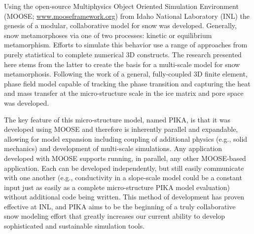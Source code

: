 Using the open-source Multiphysics Object Oriented Simulation Environment (MOOSE; \url{www.mooseframework.org}) from Idaho National Laboratory (INL) the genesis of a modular, collaborative model for snow was developed. Generally, snow metamorphoses via one of two processes: kinetic or equilibrium metamorphism. Efforts to simulate this behavior use a range of approaches from purely statistical to complete numerical 3D constructs. The research presented here stems from the latter to create the basis for a multi-scale model for snow metamorphosis. Following the work of \citet{kaempfer2009phase} a general, fully-coupled 3D finite element, phase field model capable of tracking the phase transition and capturing the heat and mass transfer at the micro-structure scale in the ice matrix and pore space was developed.

The key feature of this micro-structure model, named PIKA, is that it was developed using MOOSE and therefore is inherently parallel and expandable, allowing for model expansion including coupling of additional physics (e.g., solid mechanics) and development of multi-scale simulations. Any application developed with MOOSE supports running, in parallel, any other MOOSE-based application. Each can be developed independently, but still easily communicate with one another (e.g., conductivity in a slope-scale model could be a constant input just as easily as a complete micro-structure PIKA model evaluation) without additional code being written. This method of development has proven effective at INL, and PIKA aims to be the beginning of a truly collaborative snow modeling effort that greatly increases our current ability to develop sophisticated and sustainable simulation tools.
